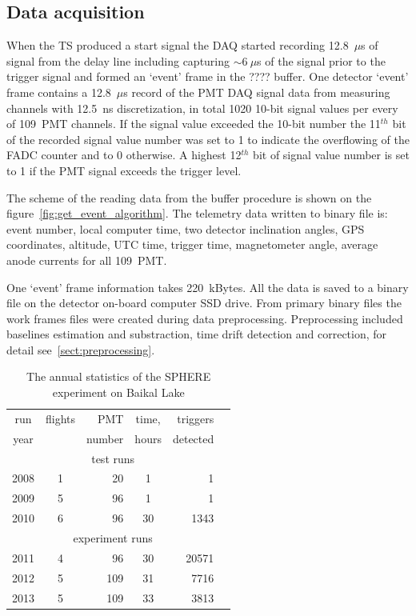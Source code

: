 \documentclass[final,5p,times,twocolumn]{elsarticle}
\begin{document}
\subsection{Data acquisition} 

When the TS produced a start signal the DAQ started recording 12.8~$\mu$s of signal from the delay line including capturing $\sim 6~\mu$s of the signal prior to the trigger signal and formed an `event' frame in the ???? buffer. One detector `event' frame contains a 12.8~$\mu$s record of the PMT DAQ signal data from measuring channels with 12.5~ns discretization, in total 1020 10-bit signal values per every of 109~PMT channels. If the signal value exceeded the 10-bit number the 11$^{th}$ bit of the recorded signal value number was set to 1 to indicate the overflowing of the FADC counter and to 0 otherwise. A highest 12$^{th}$ bit of signal value number is set to 1 if the PMT signal exceeds the trigger level. 

The scheme of the reading data from the buffer procedure is shown on the figure~\ref{fig:get_event_algorithm}. 
The telemetry data written to binary file is: event number, local computer time, two detector inclination angles, GPS coordinates, altitude, UTC time, trigger time, magnetometer angle, average anode currents for all 109~PMT. 



One `event' frame information takes 220~kBytes. All the data is saved to a binary file on the detector on-board computer SSD drive. From primary binary files the work frames files were created during data preprocessing. Preprocessing included baselines estimation and substraction, time drift detection and correction, for detail see~\ref{sect:preprocessing}.


\begin{table}[b]
\centering
\caption{The annual statistics of the SPHERE experiment on Baikal Lake}
\label{tab:statistics}
\vspace{1pc}
\begin{tabular}{|c||c|r|c|r|r|}
\hline
run  & flights & PMT    & time, & triggers \\ 
year &         & number & hours & detected \\ 
\hline \hline
\multicolumn{5}{|c|}{test runs} \\
\hline
2008 & 1 &  20 &  1 &     1 \\ 
2009 & 5 &  96 &  1 &     1 \\ 
2010 & 6 &  96 & 30 &  1343 \\
\hline
\multicolumn{5}{|c|}{experiment runs} \\
\hline
2011 & 4 &  96 & 30 & 20571 \\
2012 & 5 & 109 & 31 &  7716 \\
2013 & 5 & 109 & 33 &  3813 \\
\hline
\end{tabular}
\end{table}
\end{document}
